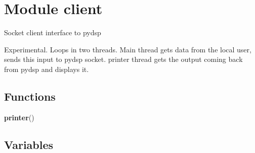%
%
%


\section{Module client}

    \label{client}
Socket client interface to pydsp

Experimental. Loops in two threads. Main thread gets data from the local 
user, sends this input to pydsp socket. printer thread gets the output 
coming back from pydsp and displays it.



  \subsection{Functions}

    \label{client:printer}

    \vspace{0.5ex}

    \begin{boxedminipage}{\textwidth}

    \raggedright \textbf{printer}()

    \end{boxedminipage}



  \subsection{Variables}


